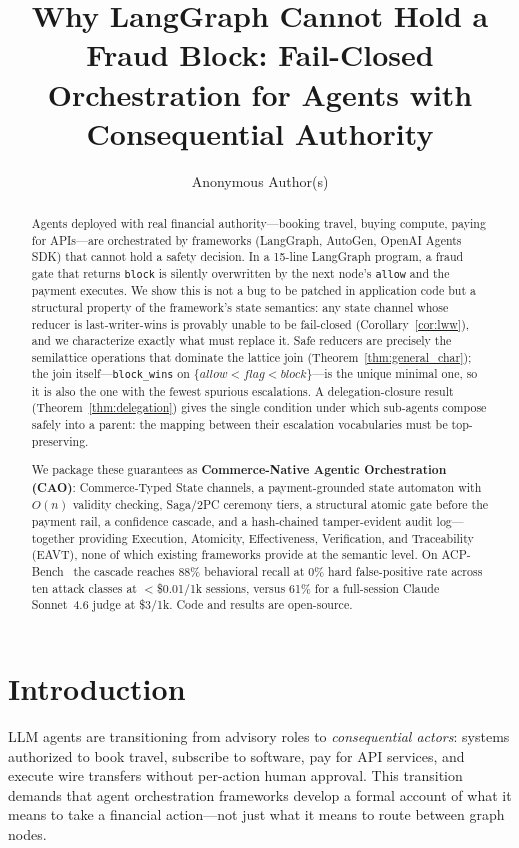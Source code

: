 \documentclass{article}
\title{Why LangGraph Cannot Hold a Fraud Block: Fail-Closed Orchestration for Agents with Consequential Authority}
\author{%
  Anonymous Author(s)
}
\begin{document}
\maketitle

\begin{abstract}
Agents deployed with real financial authority---booking travel, buying compute, paying
for APIs---are orchestrated by frameworks (LangGraph, AutoGen, OpenAI Agents SDK) that
cannot hold a safety decision. In a 15-line LangGraph program, a fraud gate that returns
\texttt{block} is silently overwritten by the next node's \texttt{allow} and the payment
executes. We show this is not a bug to be patched in application code but a structural
property of the framework's state semantics: any state channel whose reducer is
last-writer-wins is provably unable to be fail-closed (Corollary~\ref{cor:lww}), and we
characterize exactly what must replace it. Safe reducers are precisely the semilattice
operations that dominate the lattice join (Theorem~\ref{thm:general_char}); the join
itself---\texttt{block\_wins} on $\{\textit{allow}<\textit{flag}<\textit{block}\}$---is
the unique minimal one, so it is also the one with the fewest spurious escalations. A
delegation-closure result (Theorem~\ref{thm:delegation}) gives the single condition under
which sub-agents compose safely into a parent: the mapping between their escalation
vocabularies must be top-preserving.

We package these guarantees as \textbf{Commerce-Native Agentic Orchestration (CAO)}:
Commerce-Typed State channels, a payment-grounded state automaton with $O(n)$ validity
checking, Saga/2PC ceremony tiers, a structural atomic gate before the payment rail, a
confidence cascade, and a hash-chained tamper-evident audit log---together providing
Execution, Atomicity, Effectiveness, Verification, and Traceability (EAVT), none of which
existing frameworks provide at the semantic level. On ACP-Bench~\cite{acpbench} the
cascade reaches 88\% behavioral recall at 0\% hard false-positive rate across ten attack
classes at $<$\$0.01/1k sessions, versus 61\% for a full-session Claude Sonnet~4.6 judge at
\$3/1k. Code and results are open-source.
\end{abstract}

\section{Introduction}

LLM agents are transitioning from advisory roles to \emph{consequential actors}: systems authorized to book travel, subscribe to software, pay for API services, and execute wire transfers without per-action human approval. This transition demands that agent orchestration frameworks develop a formal account of what it means to take a financial action---not just what it means to route between graph nodes.
\end{document}
